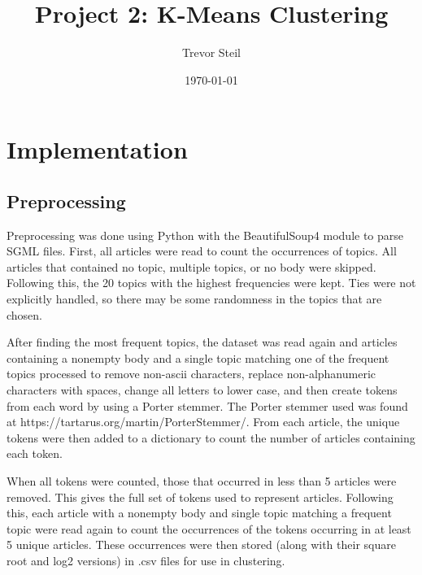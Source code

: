 \documentclass[11pt]{article}
\title{Project 2: K-Means Clustering }
\date{\today}
\author{Trevor Steil}
\begin{document}
    \maketitle

    \section{Implementation}
        \subsection{Preprocessing}
        Preprocessing was done using Python with the BeautifulSoup4 module to parse SGML files. First, all articles were read to count the occurrences of topics. All
        articles that contained no topic, multiple topics, or no body were skipped. Following this, the 20 topics with the highest frequencies were
        kept. Ties were not explicitly handled, so there may be some randomness in the topics that are chosen.

        After finding the most frequent topics, the dataset was read again and articles containing a nonempty body and a single topic matching one of
        the frequent topics processed to remove non-ascii characters, replace non-alphanumeric characters with spaces, change all letters to lower
        case, and then create tokens from each word by using a Porter stemmer. The Porter stemmer used was found at
        https://tartarus.org/martin/PorterStemmer/. From each article, the unique tokens were then added to a dictionary to count the number of
        articles containing each token.

        When all tokens were counted, those that occurred in less than 5 articles were removed. This gives the full set of tokens used to represent
        articles. Following this, each article with a nonempty body and single topic matching a frequent topic were read again to count the
        occurrences of the tokens occurring in at least 5 unique articles. These occurrences were then stored (along with their square root and log2
        versions) in .csv files for use in clustering.
\end{document}

